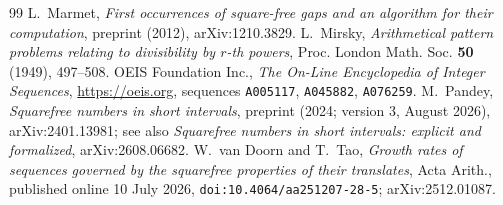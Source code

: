 \documentclass[10pt,a4paper]{amsart}
\numberwithin{equation}{section}
\begin{document}
\begin{thebibliography}{99}
 L.~Marmet, \emph{First occurrences of square-free gaps and an algorithm for their computation}, preprint (2012), arXiv:1210.3829.
 L.~Mirsky, \emph{Arithmetical pattern problems relating to divisibility by $r$-th powers}, Proc. London Math. Soc. \textbf{50} (1949), 497--508.
 OEIS Foundation Inc., \emph{The On-Line Encyclopedia of Integer Sequences}, \url{https://oeis.org}, sequences \texttt{A005117}, \texttt{A045882}, \texttt{A076259}.
 M.~Pandey, \emph{Squarefree numbers in short intervals}, preprint (2024; version 3, August 2026), arXiv:2401.13981; see also \emph{Squarefree numbers in short intervals: explicit and formalized}, arXiv:2608.06682.
 W.~van Doorn and T.~Tao, \emph{Growth rates of sequences governed by the squarefree properties of their translates}, Acta Arith., published online 10 July 2026, \texttt{doi:10.4064/aa251207-28-5}; arXiv:2512.01087.
\end{thebibliography}
\end{document}
